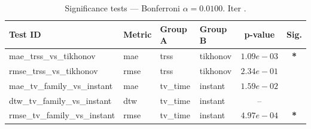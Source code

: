﻿%
\begin{table}[ht]
\centering
\caption[EEG reconstruction - Iteration it11]{Significance tests — Bonferroni $\alpha=0.0100$. Iter .}
\label{tab:sig_it11_physionet_high_missing}
\small
\begin{tabular}{llllcc}
\toprule
Test ID & Metric & Group A & Group B & p-value & Sig. \\
\midrule
mae\_trss\_vs\_tikhonov & mae & trss & tikhonov & $1.09e-03$ & \textbf{*} \\
rmse\_trss\_vs\_tikhonov & rmse & trss & tikhonov & $2.34e-01$ &  \\
mae\_tv\_family\_vs\_instant & mae & tv\_time & instant & $1.59e-02$ &  \\
dtw\_tv\_family\_vs\_instant & dtw & tv\_time & instant & -- &  \\
rmse\_tv\_family\_vs\_instant & rmse & tv\_time & instant & $4.97e-04$ & \textbf{*} \\
\bottomrule
\end{tabular}
\end{table}







